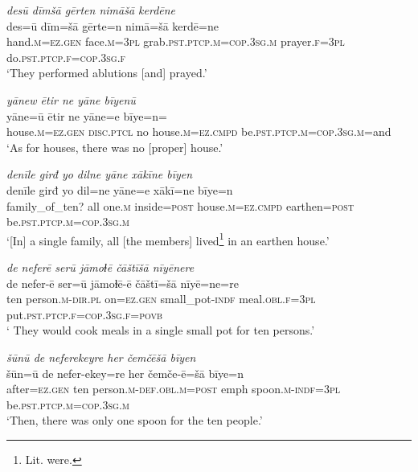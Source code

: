 \ea \label{ŽE.18}
\textit{desū dīmšā gērten nimāšā kerdēne} \\ 
\gll des=ū dīm=šā gērte=n nimā=šā kerdē=ne \\ 
 hand\textsc{.m}\textsc{\textsc{=ez.gen}} face\textsc{.m}\textsc{=3pl} grab\textsc{.pst}\textsc{.ptcp}\textsc{.m}\textsc{=cop}\textsc{.3sg}\textsc{.m} prayer\textsc{.f}\textsc{=3pl} do\textsc{.pst}\textsc{.ptcp}\textsc{.f}\textsc{=cop}\textsc{.3sg}\textsc{.f} \\ 
\glt `They performed ablutions [and] prayed.'
\z 
 
\ea \label{ŽE.25}
\textit{yānew ētir ne yāne bīyenū} \\ 
\gll yāne=ū ētir ne yāne=e bīye=n=\\ 
 house\textsc{.m}\textsc{\textsc{=ez.gen}} \textsc{disc.ptcl} no house\textsc{.m}\textsc{=ez}\textsc{.cmpd} be\textsc{.pst}\textsc{.ptcp}\textsc{.m}\textsc{=cop}\textsc{.3sg}\textsc{.m}=and \\ 
\glt `As for houses, there was no [proper] house.'
\z 
 
\ea \label{ŽE.26}
\textit{denīle girđ yo dilne yāne xākīne bīyen} \\ 
\gll denīle girđ yo dil=ne yāne=e xākī=ne bīye=n \\ 
 family\_of\_ten? all one\textsc{.m} inside\textsc{=\textsc{post}} house\textsc{.m}\textsc{=ez}\textsc{.cmpd} earthen\textsc{=\textsc{post}} be\textsc{.pst}\textsc{.ptcp}\textsc{.m}\textsc{=cop}\textsc{.3sg}\textsc{.m} \\ 
\glt `[In] a single family, all [the members] lived\footnote{Lit. were.} in an earthen house.'
\z 
 
\ea \label{ŽE.27}
\textit{de neferē serū jāmoɫē čāštīšā nīyēnere} \\ 
\gll de nefer-ē ser=ū jāmoɫē-ē čāštī=šā nīyē=ne=re \\ 
 ten person\textsc{.m}\textsc{-dir}\textsc{.pl} on\textsc{\textsc{=ez.gen}} small\_pot\textsc{-indf} meal\textsc{.obl}\textsc{.f}\textsc{=3pl} put\textsc{.pst}\textsc{.ptcp}\textsc{.f}\textsc{=cop}\textsc{.3sg}\textsc{.f}\textsc{=\textsc{povb}} \\ 
\glt ` They would cook meals in a single small pot for ten persons.'
\z 
 
\ea \label{ŽE.28}
\textit{šūnū de neferekeyre her čemčēšā bīyen} \\ 
\gll šūn=ū de nefer-ekey=re her čemče-ē=šā bīye=n \\ 
 after\textsc{\textsc{=ez.gen}} ten person\textsc{.m}\textsc{-def}\textsc{.obl}\textsc{.m}\textsc{=\textsc{post}} emph spoon\textsc{.m}\textsc{-indf}\textsc{=3pl} be\textsc{.pst}\textsc{.ptcp}\textsc{.m}\textsc{=cop}\textsc{.3sg}\textsc{.m} \\ 
\glt `Then, there was only one spoon for the ten people.'
\z 
 
